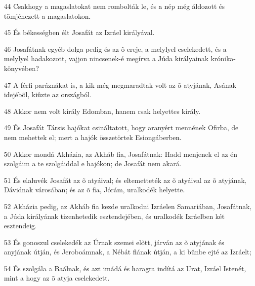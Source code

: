 \par 44 Csakhogy a magaslatokat nem rombolták le, és a nép még áldozott és tömjénezett a magaslatokon.
\par 45 És békességben élt Josafát az Izráel királyával.
\par 46 Josafátnak egyéb dolga pedig és az õ ereje, a melylyel cselekedett, és a melylyel hadakozott, vajjon nincsenek-é megírva a Júda királyainak krónika-könyvében?
\par 47 A férfi paráznákat is, a kik még megmaradtak volt az õ atyjának, Asának idejébõl, kiûzte az országból.
\par 48 Akkor nem volt király Edomban, hanem csak helyettes király.
\par 49 És Josafát Társis hajókat csináltatott, hogy aranyért mennének Ofirba, de nem mehettek el; mert a hajók összetörtek  Esiongáberben.
\par 50 Akkor mondá Akházia, az Akháb fia, Josafátnak: Hadd menjenek el az én szolgáim a te szolgáiddal e hajókon; de Josafát nem akará.
\par 51 És elaluvék Josafát az õ atyáival; és eltemetteték az õ atyáival az õ atyjának, Dávidnak városában; és az õ fia, Jórám, uralkodék helyette.
\par 52 Akházia pedig, az Akháb fia kezde uralkodni Izráelen Samariában, Josafátnak, a Júda királyának tizenhetedik esztendejében, és uralkodék Izráelben két esztendeig.
\par 53 És gonoszul cselekedék az Úrnak szemei elõtt, járván az õ atyjának és anyjának útján, és Jeroboámnak, a Nébát fiának útján, a ki bûnbe ejté az Izráelt;
\par 54 És szolgála a Baálnak, és azt imádá és haragra indítá az Urat, Izráel Istenét, mint a hogy az õ atyja cselekedett.


